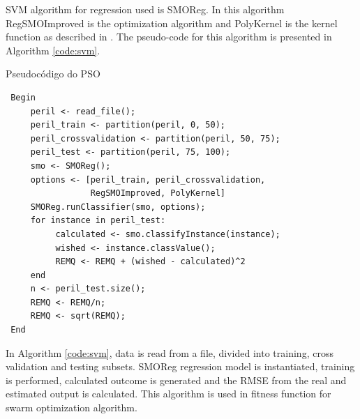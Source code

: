 SVM algorithm for regression used is SMOReg. In this algorithm RegSMOImproved is the optimization algorithm and PolyKernel is the kernel function as described in \cite{Shevade1999}. The pseudo-code for this algorithm is presented in Algorithm \ref{code:svm}.

\begin{algorithm}[H]
\label{alg:pseudocodigoPSO}
\caption{Pseudocódigo do PSO}
\end{algorithm}

\begin{small}
\label{code:svm}
\begin{verbatim}
 Begin
     peril <- read_file();
     peril_train <- partition(peril, 0, 50);
     peril_crossvalidation <- partition(peril, 50, 75);
     peril_test <- partition(peril, 75, 100);
     smo <- SMOReg();
     options <- [peril_train, peril_crossvalidation, 
                 RegSMOImproved, PolyKernel]
     SMOReg.runClassifier(smo, options);
     for instance in peril_test:
          calculated <- smo.classifyInstance(instance);
          wished <- instance.classValue();
          REMQ <- REMQ + (wished - calculated)^2
     end
     n <- peril_test.size();
     REMQ <- REMQ/n;
     REMQ <- sqrt(REMQ);
 End
\end{verbatim}
\end{small}

In Algorithm \ref{code:svm}, data is read from a file, divided into training, cross validation and testing subsets. SMOReg regression model is instantiated, training is performed, calculated outcome is generated and the RMSE from the real and estimated output is calculated. This algorithm is used in fitness function for swarm optimization algorithm.

